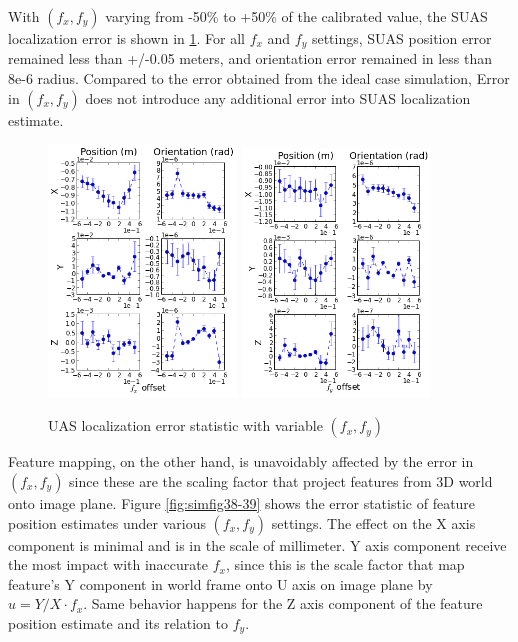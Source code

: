 With $(f_x, f_y)$ varying from -50\% to +50\% of the calibrated value, the SUAS localization error is shown in \ref{fig:simfig43-44}. For all $f_x$ and $f_y$ settings, SUAS position error remained less than +/-0.05 meters, and orientation error remained in less than 8e-6 radius. Compared to the error obtained from the ideal case simulation, Error in $(f_x, f_y)$ does not introduce any additional error into SUAS localization estimate. 
\begin{figure}[h]
  \centering
  \includegraphics[width=5cm,keepaspectratio=true]{./Figures/SimulationFigures/Figure43.png}
  \includegraphics[width=5cm,keepaspectratio=true]{./Figures/SimulationFigures/Figure44.png}
  \caption{UAS localization error statistic with variable $(f_x, f_y)$}
  \label{fig:simfig43-44}
\end{figure}

Feature mapping, on the other hand, is unavoidably affected by the
error in $(f_x, f_y)$ since these are the scaling factor that project
features from 3D world onto image plane. Figure \ref{fig:simfig38-39}
shows the error statistic of feature position estimates under various
$(f_x, f_y)$ settings. The effect on the X axis component is minimal
and is in the scale of millimeter. Y axis component receive the most
impact with inaccurate $f_x$, since this is the scale factor that map
feature's Y component in world frame onto U axis on image plane by $u
= Y/X \cdot f_x$. Same behavior happens for the Z axis component of
the feature position estimate and its relation to $f_y$.


